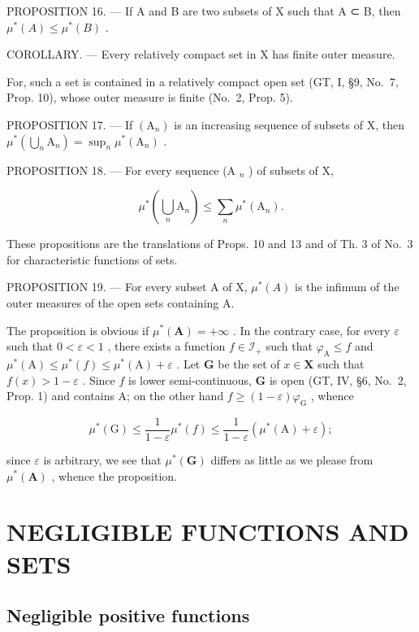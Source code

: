 PROPOSITION 16. --- If A and B are two subsets of X such that A ⊂ B, then \(\mu^{*}(A) \leqslant \mu^{*}(B)\) .

COROLLARY. --- Every relatively compact set in X has finite outer measure.

For, such a set is contained in a relatively compact open set (GT, I, §9, No.~7, Prop. 10), whose outer measure is finite (No.~2, Prop. 5).

PROPOSITION 17. --- If \((\mathrm{A}_{n})\) is an increasing sequence of subsets of X, then \(\mu^{*}(\bigcup_{n}\mathrm{A}_{n})=\sup_{n}\mu^{*}(\mathrm{A}_{n})\) .

PROPOSITION 18. --- For every sequence (A \(_{n}\) ) of subsets of X,

\[
\mu^ {*} \left(\bigcup_ {n} \mathrm{A} _ {n}\right) \leqslant \sum_ {n} \mu^ {*} (\mathrm{A} _ {n}).
\]

These propositions are the translations of Props. 10 and 13 and of Th. 3 of No.~3 for characteristic functions of sets.

PROPOSITION 19. --- For every subset A of X, \(\mu^{*}(A)\) is the infimum of the outer measures of the open sets containing A.

The proposition is obvious if \(\mu^{*}(\mathbf{A}) = +\infty\) . In the contrary case, for every \(\varepsilon\) such that \(0 < \varepsilon < 1\) , there exists a function \(f \in \mathcal{I}_{+}\) such that \(\varphi_{\mathrm{A}} \leqslant f\) and \(\mu^{*}(\mathrm{A}) \leqslant \mu^{*}(f) \leqslant \mu^{*}(\mathrm{A}) + \varepsilon\) . Let \(\mathbf{G}\) be the set of \(x \in \mathbf{X}\) such that \(f(x) > 1 - \varepsilon\) . Since \(f\) is lower semi-continuous, \(\mathbf{G}\) is open (GT, IV, §6, No.~2, Prop. 1) and contains A; on the other hand \(f \geqslant (1 - \varepsilon)\varphi_{\mathrm{G}}\) , whence

\[
\mu^ {*} (\mathrm{G}) \leqslant \frac {1}{1 - \varepsilon} \mu^ {*} (f) \leqslant \frac {1}{1 - \varepsilon} \left(\mu^ {*} (\mathrm{A}) + \varepsilon\right);
\]

since \(\varepsilon\) is arbitrary, we see that \(\mu^{*}(\mathbf{G})\) differs as little as we please from \(\mu^{*}(\mathbf{A})\) , whence the proposition.

\section{NEGLIGIBLE FUNCTIONS AND SETS}

\subsection{Negligible positive functions}

